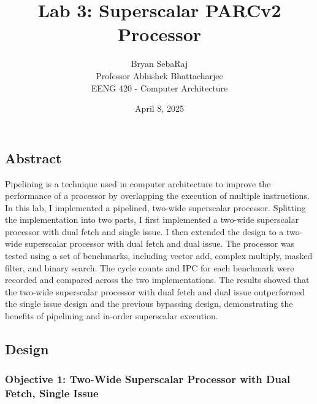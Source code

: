 \documentclass[11pt]{article}
\title{Lab 3: Superscalar PARCv2 Processor}
\author{Bryan SebaRaj \\[0.5em] Professor Abhishek Bhattacharjee \\[0.5em] EENG 420 - Computer Architecture}
\date{April 8, 2025}
\begin{document}
\maketitle


\subsection*{Abstract}

Pipelining is a technique used in computer architecture to improve the performance of
a processor by overlapping the execution of multiple instructions. In this lab, I
implemented a pipelined, two-wide superscalar processor. Splitting the implementation into two parts,
I first implemented a two-wide superscalar processor with dual fetch and single issue. I then extended the
design to a two-wide superscalar processor with dual fetch and dual issue. 
The processor was tested using a set of benchmarks, including vector add, complex multiply,
masked filter, and binary search. The cycle counts and IPC for each benchmark were recorded and
compared across the two implementations. The results showed that the two-wide superscalar processor
with dual fetch and dual issue outperformed the single issue design and the previous bypassing design, 
demonstrating the benefits of pipelining and in-order superscalar execution.


\subsection*{Design}

\subsubsection*{Objective 1: Two-Wide Superscalar Processor with Dual Fetch, Single Issue}
\end{document}

